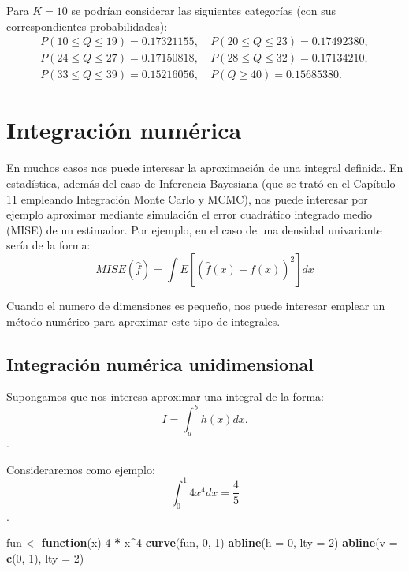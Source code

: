 \documentclass[
  spanish,
  10pt,
]{book}
\newenvironment{Shaded}{\begin{snugshade}}{\end{snugshade}}
\newcommand{\AttributeTok}[1]{\textcolor[rgb]{0.13,0.29,0.53}{#1}}
\newcommand{\ControlFlowTok}[1]{\textcolor[rgb]{0.13,0.29,0.53}{\textbf{#1}}}
\newcommand{\DecValTok}[1]{\textcolor[rgb]{0.00,0.00,0.81}{#1}}
\newcommand{\FunctionTok}[1]{\textcolor[rgb]{0.13,0.29,0.53}{\textbf{#1}}}
\newcommand{\NormalTok}[1]{#1}
\newcommand{\OtherTok}[1]{\textcolor[rgb]{0.56,0.35,0.01}{#1}}
\newcommand{\SpecialCharTok}[1]{\textcolor[rgb]{0.81,0.36,0.00}{\textbf{#1}}}
\theoremstyle{break}
\theoremstyle{nonumberplain}
\begin{document}
Para \(K=10\) se podrían considerar las siguientes categorías (con sus correspondientes probabilidades):
\[\begin{array}{rr}
P( 10 \leq Q \leq 19 ) = 0.17321155, \ & P( 20 \leq Q \leq 23 ) = 0.17492380,\\
P( 24 \leq Q \leq 27 ) = 0.17150818, \ & P( 28 \leq Q \leq 32 ) = 0.17134210,\\
P( 33 \leq Q \leq 39 ) = 0.15216056, \ & P( Q \geq 40 ) =0.15685380.
\end{array}\]

\chapter{Integración numérica}\label{int-num}

En muchos casos nos puede interesar la aproximación de una integral definida.
En estadística, además del caso de Inferencia Bayesiana (que se trató en el Capítulo 11 empleando Integración Monte Carlo y MCMC), nos puede interesar por ejemplo aproximar mediante simulación el error cuadrático integrado medio (MISE) de un estimador.
Por ejemplo, en el caso de una densidad univariante sería de la forma:
\[MISE\left( \hat{f} \right) =\int E\left[ \left( \hat{f}(x) - f(x) \right)^2\right] dx\]

Cuando el numero de dimensiones es pequeño, nos puede interesar emplear un método numérico para aproximar este tipo de integrales.

\section{Integración numérica unidimensional}\label{int-num-uni}

Supongamos que nos interesa aproximar una integral de la forma:
\[I = \int_a^b h(x)  dx.\].

Consideraremos como ejemplo:
\[\int_0^1 4x^4 dx = \frac{4}{5}\].

\begin{Shaded}
\begin{Highlighting}[]
\NormalTok{fun }\OtherTok{\textless{}{-}} \ControlFlowTok{function}\NormalTok{(x) }\DecValTok{4} \SpecialCharTok{*}\NormalTok{ x}\SpecialCharTok{\^{}}\DecValTok{4}
\FunctionTok{curve}\NormalTok{(fun, }\DecValTok{0}\NormalTok{, }\DecValTok{1}\NormalTok{)}
\FunctionTok{abline}\NormalTok{(}\AttributeTok{h =} \DecValTok{0}\NormalTok{, }\AttributeTok{lty =} \DecValTok{2}\NormalTok{)}
\FunctionTok{abline}\NormalTok{(}\AttributeTok{v =} \FunctionTok{c}\NormalTok{(}\DecValTok{0}\NormalTok{, }\DecValTok{1}\NormalTok{), }\AttributeTok{lty =} \DecValTok{2}\NormalTok{)}
\end{Highlighting}
\end{Shaded}
\end{document}
